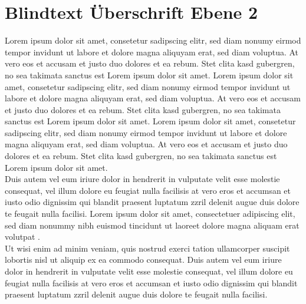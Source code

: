 \documentclass[
	english,
	ruledheaders=section,%
	class=report,%
	thesis={type=bachelor},%
	accentcolor=1b,%
	custommargins=true,%
	marginpar=false,%
	parskip=half-,%
	fontsize=11pt,%
	DIV=14,
]{tudapub}
\begin{document}
\section{Blindtext Überschrift Ebene 2}
Lorem ipsum dolor sit amet, consetetur sadipscing elitr, sed diam nonumy eirmod tempor invidunt ut labore et dolore magna aliquyam erat, sed diam voluptua. At vero eos et accusam et justo duo dolores et ea rebum. Stet clita kasd gubergren, no sea takimata sanctus est Lorem ipsum dolor sit amet. Lorem ipsum dolor sit amet, consetetur sadipscing elitr, sed diam nonumy eirmod tempor invidunt ut labore et dolore magna aliquyam erat, sed diam voluptua. At vero eos et accusam et justo duo dolores et ea rebum. Stet clita kasd gubergren, no sea takimata sanctus est Lorem ipsum dolor sit amet. Lorem ipsum dolor sit amet, consetetur sadipscing elitr, sed diam nonumy eirmod tempor invidunt ut labore et dolore magna aliquyam erat, sed diam voluptua. At vero eos et accusam et justo duo dolores et ea rebum. Stet clita kasd gubergren, no sea takimata sanctus est Lorem ipsum dolor sit amet.\\
Duis autem vel eum iriure dolor in hendrerit in vulputate velit esse molestie consequat, vel illum dolore eu feugiat nulla facilisis at vero eros et accumsan et iusto odio dignissim qui blandit praesent luptatum zzril delenit augue duis dolore te feugait nulla facilisi. Lorem ipsum dolor sit amet, consectetuer adipiscing elit, sed diam nonummy nibh euismod tincidunt ut laoreet dolore magna aliquam erat volutpat \parencite{emse-03339298, koppe2021herausforderungen}.\\
Ut wisi enim ad minim veniam, quis nostrud exerci tation ullamcorper suscipit lobortis nisl ut aliquip ex ea commodo consequat. Duis autem vel eum iriure dolor in hendrerit in vulputate velit esse molestie consequat, vel illum dolore eu feugiat nulla facilisis at vero eros et accumsan et iusto odio dignissim qui blandit praesent luptatum zzril delenit augue duis dolore te feugait nulla facilisi.\\
\end{document}

